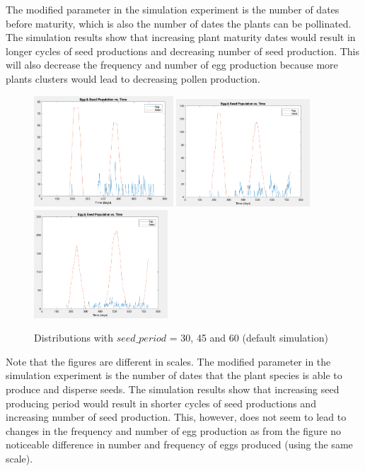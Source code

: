 \documentclass[3p,,preprint,12pt]{elsarticle}
\begin{document}
The modified parameter in the simulation experiment is the number of dates before maturity, which is also the number of dates the plants can be pollinated. The simulation results show that increasing plant maturity dates would result in longer cycles of seed productions and decreasing number of seed production. This will also decrease the frequency and number of egg production because more plants clusters would lead to decreasing pollen production. 

    \begin{figure}[!htb]
    \begin{center}
    \includegraphics[width=52mm]{figures/s2_4.png} 
    \includegraphics[width=50mm]{figures/s2_5.png} 
    \includegraphics[width=50mm]{figures/s2_1.png} 
    \caption{Distributions with $seed\_period$ = 30, 45 and 60 (default simulation)}
    \end{center}
    \end{figure}
Note that the figures are different in scales. The modified parameter in the simulation experiment is the number of dates that the plant species is able to produce and disperse seeds. The simulation results show that increasing seed producing period would result in shorter cycles of seed productions and increasing number of seed production. This, however, does not seem to lead to changes in the frequency and number of egg production as from the figure no noticeable difference in number and frequency of eggs produced (using the same scale).
\end{document}
